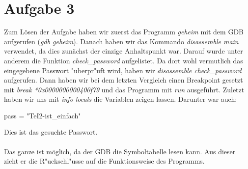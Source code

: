 \documentclass{ti2}
\begin{document}
\section*{Aufgabe 3}
Zum Lösen der Aufgabe haben wir zuerst das Programm \emph{geheim} mit dem GDB aufgerufen (\emph{gdb geheim}). Danach haben wir das Kommando \emph{disassemble main} verwendet, da dies zunächst der einzige Anhaltspunkt war. Darauf wurde unter anderem die Funktion \emph{check\_password} aufgelistet. Da dort wohl vermutlich das eingegebene Passwort "uberpr"uft wird, haben wir \emph{disassemble check\_password} aufgerufen. Dann haben wir bei dem letzten Vergleich einen Breakpoint gesetzt mit \emph{break *0x0000000000400f79} und das Programm mit \emph{run} ausgeführt. Zuletzt haben wir uns mit \emph{info locals} die Variablen zeigen lassen. Darunter war auch: 
\begin{center}
pass = "TeI2-ist\_einfach" 
\end{center}
Dies ist das gesuchte Passwort.
\\\\
Das ganze ist möglich, da der GDB die Symboltabelle lesen kann. Aus dieser zieht er die R"uckschl"usse auf die Funktionsweise des Programms.
\end{document}
